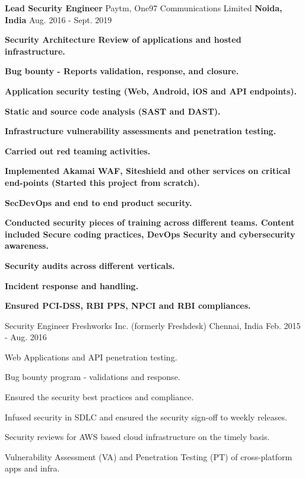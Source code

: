 \begin{cventries}
\cventry
{\textbf{\Large Lead Security Engineer}} %
{Paytm, One97 Communications Limited} %
{\textbf{\Large Noida, India}} %
{Aug. 2016 - Sept. 2019} %
{
\begin{cvitems} %
\item {\textbf{\large Security Architecture Review of applications and hosted infrastructure.}}
\item {\textbf{\large Bug bounty - Reports validation, response, and closure.}}
\item {\textbf{\large Application security testing (Web, Android, iOS and API endpoints).}}
\item {\textbf{\large Static and source code analysis (SAST and DAST).}}
\item {\textbf{\large Infrastructure vulnerability assessments and penetration testing.}}
\item {\textbf{\large Carried out red teaming activities.}}
\item {\textbf{\large Implemented Akamai WAF, Siteshield and other services on critical end-points (Started this project from scratch).}}
\item {\textbf{\large SecDevOps and end to end product security.}}
\item {\textbf{\large Conducted security pieces of training across different teams. Content included Secure coding practices, DevOps Security and cybersecurity awareness.}}
\item {\textbf{\large Security audits across different verticals.}}
\item {\textbf{\large Incident response and handling.}}
\item {\textbf{\large Ensured PCI-DSS, RBI PPS, NPCI and RBI compliances.}}
\end{cvitems}
}

  \cventry
    {Security Engineer} %
    {Freshworks Inc. (formerly Freshdesk)} %
    {Chennai, India} %
    {Feb. 2015 - Aug. 2016} %
    {
      \begin{cvitems} %
        \item {Web Applications and API penetration testing.}
        \item {Bug bounty program - validations and response.}
        \item {Ensured the security best practices and compliance.}
        \item {Infused security in SDLC and ensured the security sign-off to weekly releases.}
        \item {Security reviews for AWS based cloud infrastructure on the timely basis.}
        \item {Vulnerability Assessment (VA) and Penetration Testing (PT) of cross-platform apps and infra.}
      \end{cvitems}
    }


\end{cventries}
